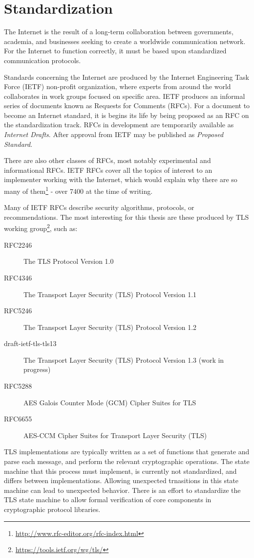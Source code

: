 \section{Standardization}

The Internet is the result of a long-term collaboration between governments, academia, and businesses seeking to create a worldwide communication network. For the Internet to function correctly, it must be based upon standardized communication protocols.

Standards concerning the Internet are produced by the Internet Engineering Task Force (IETF) non-profit organization, where experts from around the world collaborates in work groups focused on specific area. IETF produces an informal series of documents known as Requests for Comments (RFCs). For a document to become an Internet standard, it is begins its life by being proposed as an RFC on the standardization track. RFCs in development are temporarily available as \textit{Internet Drafts}. After approval from IETF may be published as \textit{Proposed Standard}. \cite{dent2004user}

There are also other classes of RFCs, most notably experimental and informational RFCs. IETF RFCs cover all the topics of interest to an implementer working with the Internet, which would explain why there are so many of them\footnote{\url{http://www.rfc-editor.org/rfc-index.html}} - over 7400 at the time of writing.

Many of IETF RFCs describe security algorithms, protocols, or recommendations. The most interesting for this thesis are these produced by TLS working group\footnote{\url{https://tools.ietf.org/wg/tls/}}, such as:

\begin{description}
  \item[RFC2246] The TLS Protocol Version 1.0
  \item[RFC4346] The Transport Layer Security (TLS) Protocol Version 1.1
  \item[RFC5246] The Transport Layer Security (TLS) Protocol Version 1.2
  \item[draft-ietf-tls-tls13] The Transport Layer Security (TLS) Protocol Version 1.3 (work in progress)
  \item[RFC5288] AES Galois Counter Mode (GCM) Cipher Suites for TLS
  \item[RFC6655] AES-CCM Cipher Suites for Transport Layer Security (TLS)
\end{description}

TLS implementations are typically written as a set of functions that generate and parse each message, and perform the relevant cryptographic operations. The state machine that this process must implement, is currently not standardized, and differs between implementations. Allowing unexpected trnasitions in this state machine can lead to unexpected behavior. There is an effort to standardize the TLS state machine to allow formal verification of core components in cryptographic protocol libraries. \cite{tls-state-machine}
